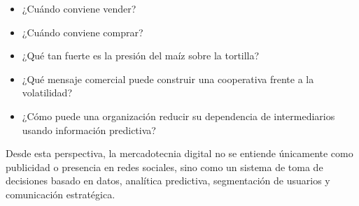 \documentclass[11pt]{article}
\providecommand{\tightlist}{%
      \setlength{\itemsep}{0pt}\setlength{\parskip}{0pt}}
\begin{document}
\begin{itemize}
\tightlist
\item
  ¿Cuándo conviene vender?
\item
  ¿Cuándo conviene comprar?
\item
  ¿Qué tan fuerte es la presión del maíz sobre la tortilla?
\item
  ¿Qué mensaje comercial puede construir una cooperativa frente a la
  volatilidad?
\item
  ¿Cómo puede una organización reducir su dependencia de intermediarios
  usando información predictiva?
\end{itemize}

Desde esta perspectiva, la mercadotecnia digital no se entiende
únicamente como publicidad o presencia en redes sociales, sino como un
sistema de toma de decisiones basado en datos, analítica predictiva,
segmentación de usuarios y comunicación estratégica.
\end{document}
